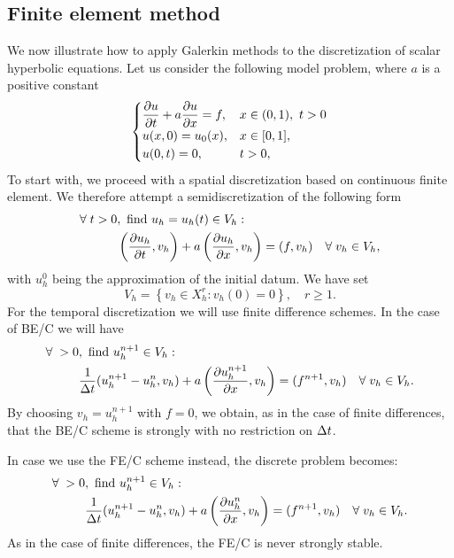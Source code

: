 \subsection{Finite element method}
We now illustrate how to apply Galerkin methods to the discretization of scalar hyperbolic equations. Let us consider the following model problem, where \(a\) is a positive constant
\begin{equation}
    \begin{cases}
        \displaystyle \partialderivative{u}{t} + a \partialderivative{u}{x} = f, & x \in (0,1), \ t > 0 \\
        u(x,0) = u_0(x), & x \in [0,1], \\
        u(0,t) = 0, & t > 0,
    \end{cases}
    \label{36_hyp}
\end{equation}
To start with, we proceed with a spatial discretization based on continuous finite element. We therefore attempt a semidiscretization of the following form 
\begin{equation}
    \begin{split}
        \forall \; t > 0&, \ \find u_h = u_h(t) \in V_h : \\
        &\left( \partialderivative{u_h}{t}, v_h \right) + a\left( \partialderivative{u_h}{x}, v_h \right) = (f,v_h) \quad \forall \; v_h \in V_h,
    \end{split}
    \label{37_hyp}
\end{equation}
with \(u_h^0\) being the approximation of the initial datum. We have set 
\[
    V_h = \left\{ v_h \in X_h^r : v_h(0) = 0 \right\}, \quad r \geq 1.
\]
For the temporal discretization we will use finite difference schemes. In the case of BE/C we will have 
\begin{equation}
    \begin{split}
        \forall \; > 0&, \ \find u^{n+1}_h \in V_h : \\
        &\frac{1}{\tstep} (u_h^{n+1}- u_h^n, v_h) + a\left( \partialderivative{u_h^{n+1}}{x}, v_h \right) = (f^{n+1}, v_h) \quad \forall \; v_h \in V_h.
    \end{split}
    \label{38_hyp}
\end{equation}
By choosing \(v_h = u_h^{n+1}\) with \(f=0\), we obtain, as in the case of finite differences, that the BE/C scheme is strongly with no restriction on \(\Delta t\). 

In case we use the FE/C scheme instead, the discrete problem becomes: 
\begin{equation}
    \begin{split}
        \forall \; > 0&, \ \find u^{n+1}_h \in V_h : \\
        &\frac{1}{\tstep} (u_h^{n+1}- u_h^n, v_h) + a\left( \partialderivative{u_h^{n}}{x}, v_h \right) = (f^{n+1}, v_h) \quad \forall \; v_h \in V_h.
    \end{split}
    \label{39_hyp}
\end{equation}
As in the case of finite differences, the FE/C is never strongly stable. 

